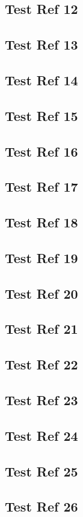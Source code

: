 \subsection{Test Ref 12}
\subsection{Test Ref 13}
\subsection{Test Ref 14}
\subsection{Test Ref 15}
\subsection{Test Ref 16}
\subsection{Test Ref 17}
\subsection{Test Ref 18}
\subsection{Test Ref 19}
\subsection{Test Ref 20}
\subsection{Test Ref 21}
\subsection{Test Ref 22}
\subsection{Test Ref 23}
\subsection{Test Ref 24}
\subsection{Test Ref 25}
\subsection{Test Ref 26}

